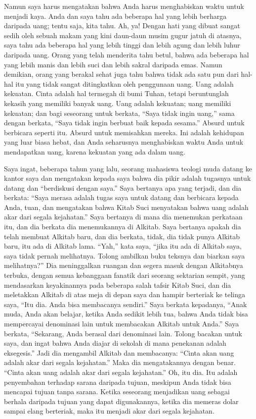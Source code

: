 \documentclass[
  letterpaper,
  DIV=11,
  numbers=noendperiod]{scrreprt}
\begin{document}
Namun saya harus mengatakan bahwa Anda harus menghabiskan waktu untuk
menjadi kaya. Anda dan saya tahu ada beberapa hal yang lebih berharga
daripada uang; tentu saja, kita tahu. Ah, ya! Dengan hati yang dibuat
sangat sedih oleh sebuah makam yang kini daun-daun musim gugur jatuh di
atasnya, saya tahu ada beberapa hal yang lebih tinggi dan lebih agung
dan lebih luhur daripada uang. Orang yang telah menderita tahu betul,
bahwa ada beberapa hal yang lebih manis dan lebih suci dan lebih sakral
daripada emas. Namun demikian, orang yang berakal sehat juga tahu bahwa
tidak ada satu pun dari hal-hal itu yang tidak sangat ditingkatkan oleh
penggunaan uang. Uang adalah kekuatan. Cinta adalah hal termegah di bumi
Tuhan, tetapi beruntunglah kekasih yang memiliki banyak uang. Uang
adalah kekuatan; uang memiliki kekuatan; dan bagi seseorang untuk
berkata, ``Saya tidak ingin uang,'' sama dengan berkata, ``Saya tidak
ingin berbuat baik kepada sesama.'' Absurd untuk berbicara seperti itu.
Absurd untuk memisahkan mereka. Ini adalah kehidupan yang luar biasa
hebat, dan Anda seharusnya menghabiskan waktu Anda untuk mendapatkan
uang, karena kekuatan yang ada dalam uang.

Saya ingat, beberapa tahun yang lalu, seorang mahasiswa teologi muda
datang ke kantor saya dan mengatakan kepada saya bahwa dia pikir adalah
tugasnya untuk datang dan ``berdiskusi dengan saya.'' Saya bertanya apa
yang terjadi, dan dia berkata: ``Saya merasa adalah tugas saya untuk
datang dan berbicara kepada Anda, tuan, dan mengatakan bahwa Kitab Suci
menyatakan bahwa uang adalah akar dari segala kejahatan.'' Saya bertanya
di mana dia menemukan perkataan itu, dan dia berkata dia menemukannya di
Alkitab. Saya bertanya apakah dia telah membuat Alkitab baru, dan dia
berkata, tidak, dia tidak punya Alkitab baru, itu ada di Alkitab lama.
``Yah,'' kata saya, ``jika itu ada di Alkitab saya, saya tidak pernah
melihatnya. Tolong ambilkan buku teksnya dan biarkan saya melihatnya?''
Dia meninggalkan ruangan dan segera masuk dengan Alkitabnya terbuka,
dengan semua kebanggaan fanatik dari seorang sektarian sempit, yang
mendasarkan keyakinannya pada beberapa salah tafsir Kitab Suci, dan dia
meletakkan Alkitab di atas meja di depan saya dan hampir berteriak ke
telinga saya, ``Itu dia. Anda bisa membacanya sendiri.'' Saya berkata
kepadanya, ``Anak muda, Anda akan belajar, ketika Anda sedikit lebih
tua, bahwa Anda tidak bisa mempercayai denominasi lain untuk membacakan
Alkitab untuk Anda.'' Saya berkata, ``Sekarang, Anda berasal dari
denominasi lain. Tolong bacakan untuk saya, dan ingat bahwa Anda diajar
di sekolah di mana penekanan adalah eksegesis.'' Jadi dia mengambil
Alkitab dan membacanya: ``Cinta akan uang adalah akar dari segala
kejahatan.'' Maka dia mengatakannya dengan benar. ``Cinta akan uang
adalah akar dari segala kejahatan.'' Oh, itu dia. Itu adalah penyembahan
terhadap sarana daripada tujuan, meskipun Anda tidak bisa mencapai
tujuan tanpa sarana. Ketika seseorang menjadikan uang sebagai berhala
daripada tujuan yang dapat digunakannya, ketika dia memeras dolar sampai
elang berteriak, maka itu menjadi akar dari segala kejahatan.
\end{document}
